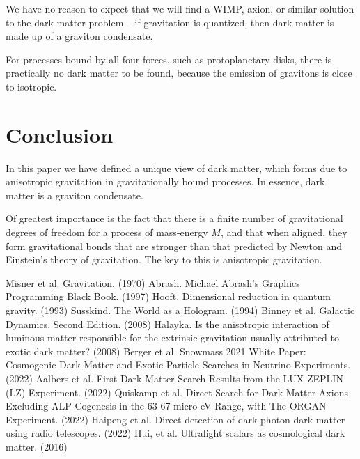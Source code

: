 \documentclass[12pt]{article}
\begin{document}
We have no reason to expect that we will find a WIMP, axion, or similar solution \cite{berger, aalbers, quiskamp, haipeng, hui} to the dark matter problem -- if gravitation is quantized, then dark matter is made up of a graviton condensate.

For processes bound by all four forces, such as protoplanetary disks, there is practically no dark matter to be found, because the emission of gravitons is close to isotropic.




\section{Conclusion}

In this paper we have defined a unique view of dark matter, which forms due to anisotropic gravitation in gravitationally bound processes.
In essence, dark matter is a graviton condensate.

Of greatest importance is the fact that there is a finite number of gravitational degrees of freedom for a process of mass-energy $M$, and that when aligned, they form gravitational bonds that are stronger than that predicted by Newton and Einstein's theory of gravitation.
The key to this is anisotropic gravitation.






\begin{thebibliography}{9}
 Misner et al. Gravitation. (1970)
 Abrash. Michael Abrash's Graphics Programming Black Book. (1997)
 Hooft. Dimensional reduction in quantum gravity. (1993)
 Susskind. The World as a Hologram. (1994)
 Binney et al. Galactic Dynamics. Second Edition. (2008)
 Halayka. Is the anisotropic interaction of luminous matter responsible for the extrinsic gravitation usually attributed to exotic dark matter? (2008)
 Berger et al. Snowmass 2021 White Paper: Cosmogenic Dark Matter and Exotic Particle Searches in Neutrino Experiments. (2022)
 Aalbers et al. First Dark Matter Search Results from the LUX-ZEPLIN (LZ) Experiment. (2022)
 Quiskamp et al. Direct Search for Dark Matter Axions Excluding ALP Cogenesis in the 63-67 micro-eV Range, with The ORGAN Experiment. (2022)
 Haipeng et al. Direct detection of dark photon dark matter using radio telescopes. (2022)
 Hui, et al. Ultralight scalars as cosmological dark matter. (2016)
\end{thebibliography}
\end{document}
